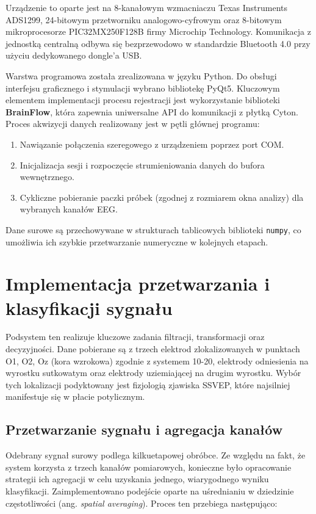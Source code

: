 Urządzenie to oparte jest na 8-kanałowym wzmacniaczu Texas Instruments ADS1299, 24-bitowym przetworniku analogowo-cyfrowym oraz 8-bitowym mikroprocesorze PIC32MX250F128B firmy Microchip Technology.
Komunikacja z jednostką centralną odbywa się bezprzewodowo w standardzie Bluetooth 4.0 przy użyciu dedykowanego dongle'a USB.

Warstwa programowa została zrealizowana w języku Python. Do obsługi interfejsu graficznego i stymulacji wybrano bibliotekę PyQt5.
Kluczowym elementem implementacji procesu rejestracji jest wykorzystanie biblioteki \textbf{BrainFlow}, która zapewnia uniwersalne API do komunikacji z płytką Cyton.
Proces akwizycji danych realizowany jest w pętli głównej programu:
\begin{enumerate}
    \item Nawiązanie połączenia szeregowego z urządzeniem poprzez port COM.
    \item Inicjalizacja sesji i rozpoczęcie strumieniowania danych do bufora wewnętrznego.
    \item Cykliczne pobieranie paczki próbek (zgodnej z rozmiarem okna analizy) dla wybranych kanałów EEG.
\end{enumerate}
Dane surowe są przechowywane w strukturach tablicowych biblioteki \texttt{numpy}, co umożliwia ich szybkie przetwarzanie numeryczne w kolejnych etapach.

\section{Implementacja przetwarzania i klasyfikacji sygnału}

Podsystem ten realizuje kluczowe zadania filtracji, transformacji oraz decyzyjności.
Dane pobierane są z trzech elektrod zlokalizowanych w punktach O1, O2, Oz (kora wzrokowa) zgodnie z systemem 10-20, elektrody odniesienia na wyrostku sutkowatym oraz elektrody uziemiającej na drugim wyrostku.
Wybór tych lokalizacji podyktowany jest fizjologią zjawiska SSVEP, które najsilniej manifestuje się w płacie potylicznym.

\subsection*{Przetwarzanie sygnału i agregacja kanałów}

Odebrany sygnał surowy podlega kilkuetapowej obróbce. Ze względu na fakt, że system korzysta z trzech kanałów pomiarowych, konieczne było opracowanie strategii ich agregacji w celu uzyskania jednego, wiarygodnego wyniku klasyfikacji.
Zaimplementowano podejście oparte na uśrednianiu w dziedzinie częstotliwości (ang. \textit{spatial averaging}). Proces ten przebiega następująco:

